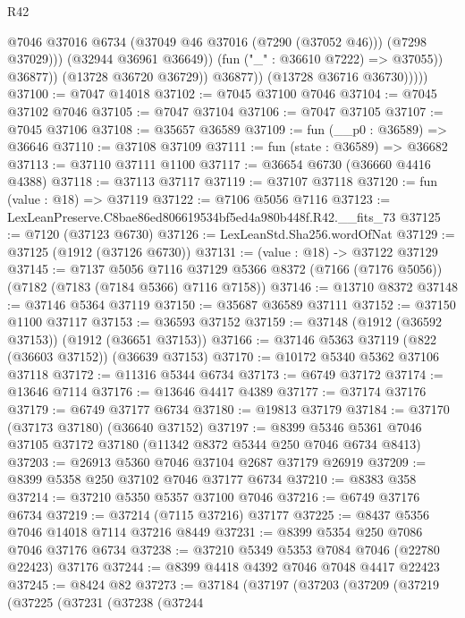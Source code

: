 \begin{lexlean}{R42}
\begin{coremodule}
{                              @7046
                              @37016
                              @6734
                              (@37049 @46 @37016 (@7290 (@37052 @46)))
                              (@7298 @37029)))
                          (@32944 @36961 @36649))
                        (fun ("_" : @36610 @7222) => @37055))
                      @36877))
                  (@13728 @36720 @36729))
                @36877))
            (@13728 @36716 @36730)))))
@37100 := @7047 @14018
@37102 := @7045 @37100 @7046
@37104 := @7045 @37102 @7046
@37105 := @7047 @37104
@37106 := @7047 @37105
@37107 := @7045 @37106
@37108 := @35657 @36589
@37109 := fun (__p0 : @36589) => @36646
@37110 := @37108 @37109
@37111 := fun (state : @36589) => @36682
@37113 := @37110 @37111 @1100
@37117 := @36654 @6730 (@36660 @4416 @4388)
@37118 := @37113 @37117
@37119 := @37107 @37118
@37120 := fun (value : @18) => @37119
@37122 := @7106 @5056 @7116
@37123 := LexLeanPreserve.C8bae86ed806619534bf5ed4a980b448f.R42.__fits_73
@37125 := @7120 (@37123 @6730)
@37126 := LexLeanStd.Sha256.wordOfNat
@37129 := @37125 (@1912 (@37126 @6730))
@37131 := (value : @18) -> @37122 @37129
@37145 := @7137
    @5056
    @7116
    @37129
    @5366
    @8372
    (@7166 (@7176 @5056))
    (@7182 (@7183 (@7184 @5366) @7116 @7158))
@37146 := @13710 @8372
@37148 := @37146 @5364 @37119
@37150 := @35687 @36589 @37111
@37152 := @37150 @1100 @37117
@37153 := @36593 @37152
@37159 := @37148 (@1912 (@36592 @37153)) (@1912 (@36651 @37153))
@37166 := @37146 @5363 @37119 (@822 (@36603 @37152)) (@36639 @37153)
@37170 := @10172 @5340 @5362 @37106 @37118
@37172 := @11316 @5344 @6734
@37173 := @6749 @37172
@37174 := @13646 @7114
@37176 := @13646 @4417 @4389
@37177 := @37174 @37176
@37179 := @6749 @37177 @6734
@37180 := @19813 @37179
@37184 := @37170 (@37173 @37180) (@36640 @37152)
@37197 := @8399 @5346 @5361 @7046 @37105 @37172 @37180 (@11342 @8372 @5344 @250 @7046 @6734 @8413)
@37203 := @26913 @5360 @7046 @37104 @2687 @37179 @26919
@37209 := @8399 @5358 @250 @37102 @7046 @37177 @6734
@37210 := @8383 @358
@37214 := @37210 @5350 @5357 @37100 @7046
@37216 := @6749 @37176 @6734
@37219 := @37214 (@7115 @37216) @37177
@37225 := @8437 @5356 @7046 @14018 @7114 @37216 @8449
@37231 := @8399 @5354 @250 @7086 @7046 @37176 @6734
@37238 := @37210 @5349 @5353 @7084 @7046 (@22780 @22423) @37176
@37244 := @8399 @4418 @4392 @7046 @7048 @4417 @22423
@37245 := @8424 @82
@37273 := @37184
    (@37197
      (@37203
        (@37209
          (@37219
            (@37225
              (@37231
                (@37238
                  (@37244
}
\end{coremodule}
\end{lexlean}
